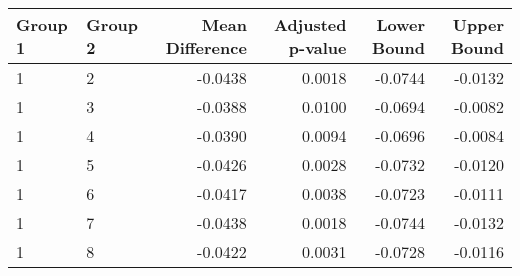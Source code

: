 \begin{tabular}{llrrrr}
\toprule
Group 1 & Group 2 & Mean Difference & Adjusted p-value & Lower Bound & Upper Bound \\
\midrule
1 & 2 & -0.0438 & 0.0018 & -0.0744 & -0.0132 \\
1 & 3 & -0.0388 & 0.0100 & -0.0694 & -0.0082 \\
1 & 4 & -0.0390 & 0.0094 & -0.0696 & -0.0084 \\
1 & 5 & -0.0426 & 0.0028 & -0.0732 & -0.0120 \\
1 & 6 & -0.0417 & 0.0038 & -0.0723 & -0.0111 \\
1 & 7 & -0.0438 & 0.0018 & -0.0744 & -0.0132 \\
1 & 8 & -0.0422 & 0.0031 & -0.0728 & -0.0116 \\
\bottomrule
\end{tabular}
